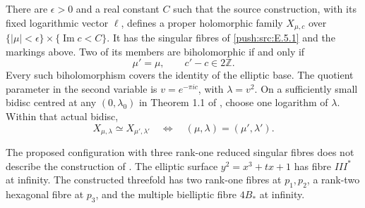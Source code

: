 
\begin{theorem}\hypertarget{tag-033P}{}\label{push:src:E.5.3}


There are $\epsilon>0$ and a real constant $C$ such that the
source construction, with its fixed logarithmic vector $\ell$,
defines a proper holomorphic family
$X_{\mu,c}$ over
$\{ |\mu|<\epsilon\}\times\{\operatorname{Im}c<C\}$.
It has the singular fibres of \ref{push:src:E.5.1} and the markings above.
Two of its members are biholomorphic if and only if
\[
 \mu'=\mu,\qquad c'-c\in2\mathbb Z.
\]
Every such biholomorphism covers the identity of the elliptic
base.  The quotient parameter in the second variable is
$v=e^{-\pi i c}$, with $\lambda=v^2$.
On a sufficiently small bidisc centred at any
$(0,\lambda_0)$ in Theorem 1.1 of \cite{ViaTwo26push}, choose
one logarithm of $\lambda$.  Within that actual bidisc,
\[
 X_{\mu,\lambda}\simeq X_{\mu',\lambda'}
 \quad\Longleftrightarrow\quad
 (\mu,\lambda)=(\mu',\lambda').
\]
\end{theorem}

\begin{proposition}\hypertarget{tag-033N}{}\label{push:src:E.5.1}


The proposed configuration with three rank-one reduced singular fibres
does not describe the construction of \cite{ViaTwo26push}. The elliptic surface
$y^2=x^3+tx+1$ has fibre $III^*$ at infinity.  The constructed
threefold has two rank-one fibres at $p_1,p_2$, a rank-two
hexagonal fibre at $p_3$, and the multiple bielliptic fibre
$4B_*$ at infinity.
\end{proposition}

